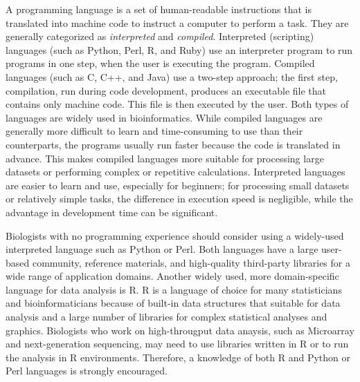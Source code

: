 \documentclass[ChapterTOCs,krantz2]{krantz} %
\begin{document}
A programming language is a set of human-readable instructions that is translated into
machine code to instruct a computer to perform a task.
They are generally categorized as \emph{interpreted} and \emph{compiled}.
Interpreted (scripting) languages (such as Python, Perl, R, and Ruby) use an
interpreter program to run programs in one step, 
when the user is executing the
program. Compiled languages (such as C, C++, and Java)
use a two-step approach; the first step, compilation, run 
during code development, produces an executable file that
contains only machine code. This file is then executed by the user. Both types of languages are widely used in
bioinformatics. While compiled languages are generally more difficult to learn
and time-consuming to use than their counterparts, the 
programs usually run faster because the code is translated in advance.
This makes compiled languages more suitable for processing large
datasets or performing complex or repetitive calculations. Interpreted languages are
easier to learn and use, especially for beginners; for processing 
small datasets or relatively simple
tasks, the difference in execution speed is negligible, while the advantage
in development time can be significant.

Biologists with no programming experience should consider using a widely-used 
interpreted language such as Python or Perl.
Both languages have a large user-based community, reference materials, and
high-quality third-party libraries for a wide range of application domains.
Another widely used, more domain-specific language for data analysis is R.
R is a language of choice for many statisticians and bioinformaticians because of
built-in data structures that suitable for data analysis and a large number of
libraries for complex statistical analyses and graphics.
Biologists who work on high-througput data anaysis, such as Microarray and next-generation
sequencing, may need to use libraries written in R or to run the analysis in R environments.
Therefore, a knowledge of both R and Python or Perl languages is strongly encouraged.
\end{document}
